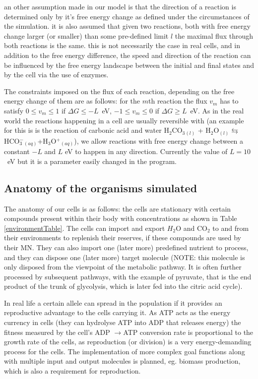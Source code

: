 \documentclass[10pt,a4paper]{article}
\begin{document}
	an other assumption made in our model is that the direction of a reaction is determined only by it's free energy change as defined under the circumstances of the simulation. it is also assumed that given two reactions, both with free energy change larger (or smaller) than some pre-defined limit $l$ the maximal flux through both reactions is the same. this is not necessarily the case in real cells, and in addition to the free energy difference, the speed and direction of the reaction can be influenced by the free energy landscape between the initial and final states and by the cell via the use of enzymes. 

	The constraints imposed on the flux of each reaction, depending on the free energy change of them are as follows: for the $m$th reaction the flux $v_m$ has to satisfy $0\leq v_m \leq 1 $ if $\Delta G \leq -L$~eV, $-1\leq v_m \leq 0 $ if $\Delta G \geq L$~eV. As in the real world the reactions happening in a cell are usually reversible with (an example for this is is the reaction of carbonic acid and water H$_2$CO$_3$$_{(l)}$ + H$_2$O$_{(l)} \leftrightarrows$ HCO$^-_3$$_{(aq)}$+H$_3$O$^+$$_{(aq)}$), we allow reactions with free energy change between a constant $-L$ and $L$ eV to happen in any direction. Currently the value of $L=10$~eV but it is a parameter easily changed in the program. 

	
	
	\subsection{Anatomy of the organisms simulated}
	\label{ssub:anatomy_of_the_oganisms_simulated}
	
	The anatomy of our cells is as follows: the cells are stationary with certain compounds present within their body with concentrations as shown in Table \ref{environmentTable}. The cells can import and export $H_2$O and CO$_2$ to and from their environments to replenish their reserves, if these compounds are used by their MN. They can also import one (later more) predefined nutrient to process, and they can dispose  one (later more) target molecule (NOTE: this molecule is only disposed from the viewpoint of the metabolic pathway. It is often further processed by subsequent pathways, with the example of pyruvate, that is the end product of the trunk of glycolysis, which is later fed into the citric acid cycle). 
	
	In real life a certain allele can spread in the population if it provides an reproductive advantage to the cells carrying it.  As ATP acts as the energy currency in cells (they can hydrolyse ATP into ADP that releases energy) the fitness  measured by the cell's ADP $\rightarrow$ATP conversion rate is proportional to the growth rate of the cells, as reproduction (or division) is a very energy-demanding  process for the cells.  The implementation of more complex goal functions along with multiple input and output molecules is planned, eg. biomass production, which is also a requirement for reproduction. 
\end{document}
